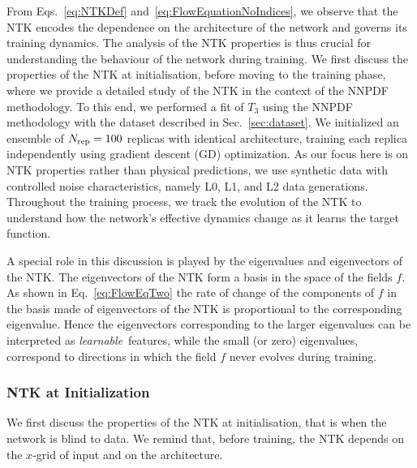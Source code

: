 From Eqs.~\eqref{eq:NTKDef} and~\eqref{eq:FlowEquationNoIndices}, we observe
that the NTK encodes the dependence on the architecture of the network and
governs its training dynamics. The analysis of the NTK properties is thus
crucial for understanding the behaviour of the network during training. We first
discuss the properties of the NTK at initialisation, before moving to the
training phase, where we provide a detailed study of the NTK in the context of
the NNPDF methodology. To this end, we performed a fit of $T_3$ using the NNPDF
methodology with the dataset described in Sec.~\ref{sec:dataset}. We initialized
an ensemble of $N_{\rm rep} = 100$ replicas with identical architecture, training
each replica independently using gradient descent (GD) optimization. As our
focus here is on NTK properties rather than physical predictions, we use
synthetic data with controlled noise characteristics, namely L0, L1, and L2 data
generations. Throughout the training process, we track the evolution of the NTK
to understand how the network's effective dynamics change as it learns the
target function.

A special role in this discussion is played by the eigenvalues and eigenvectors
of the NTK. The eigenvectors of the NTK form a basis in the space of the fields
$f$. As shown in Eq.~\eqref{eq:FlowEqTwo} the rate of change of the components
of $f$ in the basis made of eigenvectors of the NTK is proportional to the
corresponding eigenvalue. Hence the eigenvectors corresponding to the larger
eigenvalues can be interpreted as {\em learnable}\ features, while the small (or
zero) eigenvalues, correspond to directions in which the field $f$ never evolves
during training. 

\subsubsection{NTK at Initialization}
\label{sec:NTKAtInit}
We first discuss the properties of the NTK at initialisation, that is when the
network is blind to data. We remind that, before training, the NTK depends on
the $x$-grid of input and on the architecture. 

